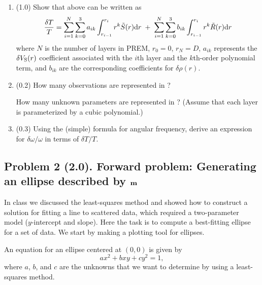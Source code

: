 \documentclass[11pt,titlepage,fleqn]{article}
\begin{document}
\begin{enumerate}
\begin{enumerate}
\item (1.0) Show that  above can be written as
%
\begin{equation}
\frac{\delta T}{T} = \sum_{i=1}^N \sum_{k=0}^3 a_{ik} \int_{r_{i-1}}^{r_i} r^{k} \tilde{S}(r) \mathrm{d} r
\;+\; \sum_{i=1}^N \sum_{k=0}^3 b_{ik} \int_{r_{i-1}}^{r_i} r^{k} \tilde{R}(r) \mathrm{d} r
\label{dT2}
\end{equation}
%
where $N$ is the number of layers in PREM, $r_0 = 0$, $r_N = D$, $a_{ik}$ represents the $\delta V_{\rm S}(r)$ coefficient associated with the $i$th layer and the $k$th-order polynomial term, and $b_{ik}$ are the corresponding coefficients for $\delta\rho(r)$.

\item (0.2) How many observations are represented in ? 

How many unknown parameters are represented in ? (Assume that each layer is parameterized by a cubic polynomial.)

\item (0.3) Using the (simple) formula for angular frequency, derive an expression for $\delta\omega/\omega$ in terms of $\delta T/T$.

\end{enumerate}

\end{enumerate}


\subsection*{Problem 2 (2.0). Forward problem: Generating an ellipse described by $\mbox{${\bf m}$}$}

In class we discussed the least-squares method and showed how to construct a solution for fitting a line to scattered data, which required a  two-parameter model ($y$-intercept and slope). Here the task is to compute a best-fitting ellipse for a set of data. We start by making a plotting tool for ellipses.

An equation for an ellipse centered at $(0,0)$ is given by
%
\begin{equation}
ax^2 + bxy + cy^2 = 1,
\label{ellipse}
\end{equation}
%
where $a$, $b$, and $c$ are the unknowns that we want to determine by using a least-squares method.
\end{document}

